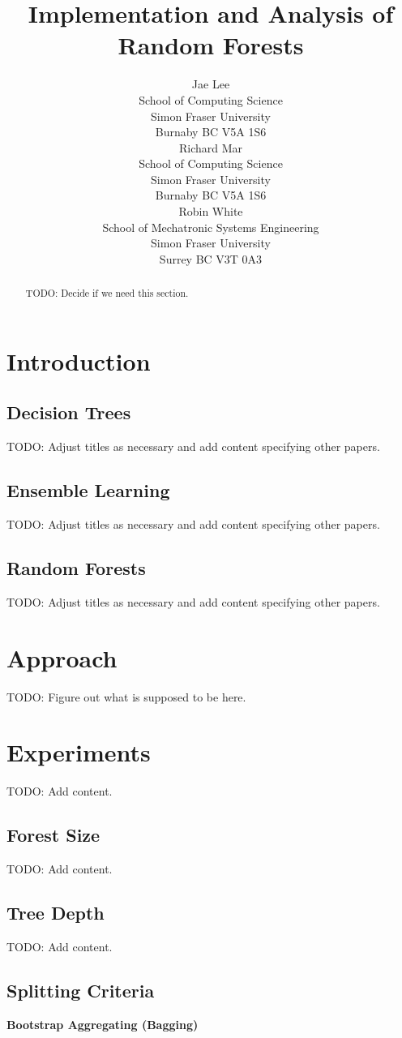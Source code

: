 \documentclass{article} %
\title{Implementation and Analysis of Random Forests}
\author{
Jae Lee\\
School of Computing Science\\
Simon Fraser University\\
Burnaby BC V5A 1S6 \\
\And
Richard Mar \\
School of Computing Science\\
Simon Fraser University\\
Burnaby BC V5A 1S6 \\
\AND
Robin White \\
School of Mechatronic Systems Engineering\\
Simon Fraser University\\
Surrey BC V3T 0A3 \\
}
\begin{document}
\maketitle

\begin{abstract}
TODO: Decide if we need this section.
\end{abstract}

\section{Introduction}

\subsection{Decision Trees}
TODO: Adjust titles as necessary and add content specifying other papers.

\subsection{Ensemble Learning}
TODO: Adjust titles as necessary and add content specifying other papers.

\subsection{Random Forests}
TODO: Adjust titles as necessary and add content specifying other papers.


\section{Approach}
TODO: Figure out what is supposed to be here.

\section{Experiments}
TODO: Add content.

\subsection{Forest Size}
TODO: Add content.

\subsection{Tree Depth}
TODO: Add content.

\subsection{Splitting Criteria}
\textbf{Bootstrap Aggregating (Bagging)}
\end{document}
